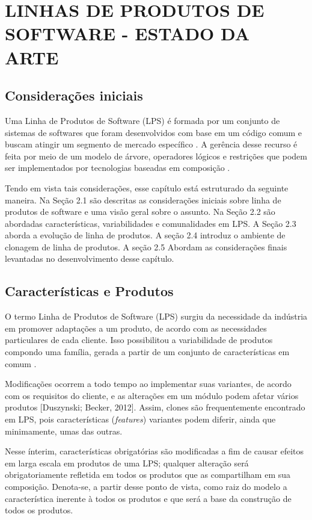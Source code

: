 \chapter{LINHAS DE PRODUTOS DE SOFTWARE - ESTADO DA ARTE}
\label{cap:lps}

\section{Considerações iniciais}

Uma Linha de Produtos de Software (LPS) é formada por um conjunto de sistemas de softwares que foram desenvolvidos com base em um código comum e buscam atingir um segmento de mercado específico \cite{apel2016feature}. A gerência desse recurso é feita por meio de um modelo de árvore, operadores lógicos e restrições que podem ser implementados por tecnologias baseadas em composição \cite{Vale2015}.


Tendo em vista tais considerações, esse capítulo está estruturado da seguinte maneira. Na Seção 2.1 são descritas as considerações iniciais sobre linha de produtos de software e uma visão geral sobre o assunto. Na Seção 2.2 são abordadas características, variabilidades e comunalidades em LPS. A Seção 2.3 aborda a evolução de linha de produtos. A seção 2.4 introduz o ambiente de clonagem de linha de produtos. A seção 2.5 Abordam as considerações finais levantadas no desenvolvimento desse capítulo.
	
\section{Características e Produtos}


O termo Linha de Produtos de Software (LPS) surgiu da necessidade da indústria em promover adaptações a um produto, de acordo com as necessidades particulares de cada cliente. Isso possibilitou a variabilidade de produtos compondo uma família, gerada a partir de um conjunto de características em comum \cite{Laguna2013}. 


Modificações ocorrem a todo tempo ao implementar suas variantes, de acordo com os requisitos do cliente, e as alterações em um módulo podem afetar vários produtos [Duszynski; Becker, 2012]. Assim, clones são frequentemente encontrado em LPS, pois características (\textit{features}) variantes podem diferir, ainda que minimamente, umas das outras.

Nesse ínterim, características obrigatórias são modificadas a fim de causar efeitos em larga escala em produtos de uma LPS; qualquer alteração será obrigatoriamente refletida em todos os produtos que as compartilham em sua composição. Denota-se, a partir desse ponto de vista, como raiz do modelo a característica inerente à todos os produtos e que será a base da construção de todos os produtos.


